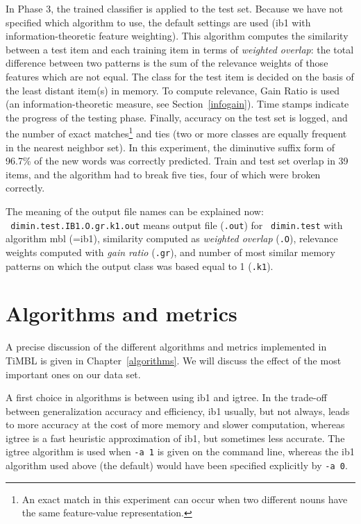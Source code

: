 \documentclass{report}
\begin{document}
In Phase 3, the trained classifier is applied to the test set. Because
we have not specified which algorithm to use, the default settings are
used ({\sc ib1} with information-theoretic feature weighting). This
algorithm computes the similarity between a test item and each
training item in terms of {\em weighted overlap}: the total difference
between two patterns is the sum of the relevance weights of those
features which are not equal. The class for the test item is decided
on the basis of the least distant item(s) in memory. To compute
relevance, Gain Ratio is used (an information-theoretic measure, see
Section~\ref{infogain}). Time stamps indicate the progress of the
testing phase. Finally, accuracy on the test set is logged, and the
number of exact matches\footnote{An exact match in this experiment can
  occur when two different nouns have the same feature-value
  representation.} and ties (two or more classes are equally frequent
in the nearest neighbor set). In this experiment, the diminutive
suffix form of 96.7\% of the new words was correctly predicted. Train
and test set overlap in 39 items, and the algorithm had to break five
ties, four of which were broken correctly.

The meaning of the output file names can be explained now:\\ {\tt
dimin.test.IB1.O.gr.k1.out} means output file ({\tt .out}) for {\tt
dimin.test} with algorithm {\sc mbl} (={\sc ib1}), similarity computed
as {\em weighted overlap} ({\tt .O}), relevance weights computed with
{\em gain ratio} ({\tt .gr}), and number of most similar memory
patterns on which the output class was based equal to 1 ({\tt .k1}).

\section{Algorithms and metrics}

A precise discussion of the different algorithms and metrics
implemented in TiMBL is given in Chapter~\ref{algorithms}. We will
discuss the effect of the most important ones on our data set.

A first choice in algorithms is between using {\sc ib1} and {\sc
igtree}. In the trade-off between generalization accuracy and
efficiency, {\sc ib1} usually, but not always, leads to more accuracy
at the cost of more memory and slower computation, whereas {\sc
igtree} is a fast heuristic approximation of {\sc ib1}, but sometimes
less accurate. The {\sc igtree} algorithm is used when {\tt -a 1} is
given on the command line, whereas the {\sc ib1} algorithm used above
(the default) would have been specified explicitly by {\tt -a 0}. 
\end{document}
